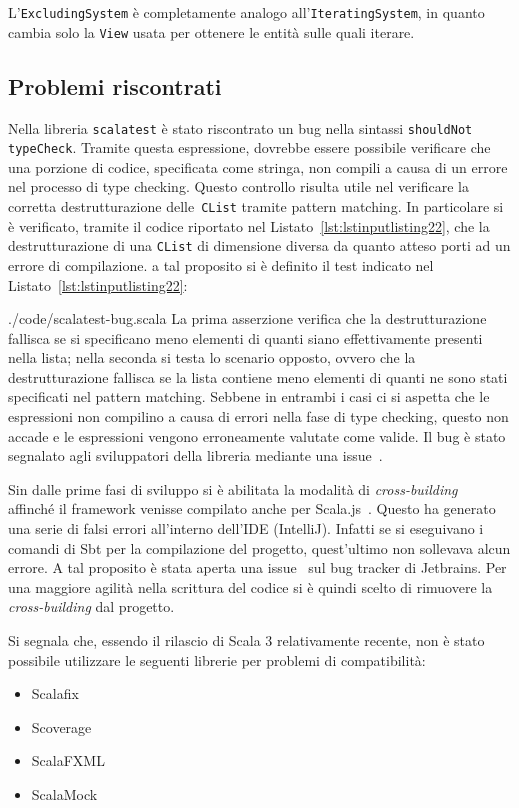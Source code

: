 L'\texttt{ExcludingSystem} è completamente analogo all'\texttt{IteratingSystem}, in quanto cambia solo la \texttt{View}
usata per ottenere le entità sulle quali iterare.

\subsection{Problemi riscontrati}\label{subsec:problemi-riscontrati}
Nella libreria \texttt{scalatest} è stato riscontrato un bug nella sintassi \texttt{shouldNot typeCheck}.
Tramite questa espressione, dovrebbe essere possibile verificare che una porzione di codice, specificata come stringa,
non compili a causa di un errore nel processo di type checking.
Questo controllo risulta utile nel verificare la corretta destrutturazione delle~\texttt{CList} tramite pattern
matching.
In particolare si è verificato, tramite il codice riportato nel Listato~\ref{lst:lstinputlisting22}, che la
destrutturazione di una \texttt{CList} di dimensione diversa da quanto atteso porti ad un errore di compilazione.
a tal proposito si è definito il test indicato nel Listato~\ref{lst:lstinputlisting22}:

{./code/scalatest-bug.scala}
La prima asserzione verifica che la destrutturazione fallisca se si specificano meno elementi di quanti siano
effettivamente presenti nella lista;
nella seconda si testa lo scenario opposto, ovvero che la destrutturazione fallisca se la lista contiene meno elementi
di quanti ne sono stati specificati nel pattern matching.
Sebbene in entrambi i casi ci si aspetta che le espressioni non compilino a causa di errori nella fase di type checking,
questo non accade e le espressioni vengono erroneamente valutate come valide.
Il bug è stato segnalato agli sviluppatori della libreria mediante una issue~\cite{scalatest-bug}.

Sin dalle prime fasi di sviluppo si è abilitata la modalità di \textit{cross-building}~\cite{cross-building} affinché il
framework venisse compilato anche per Scala.js~\cite{scalajs}.
Questo ha generato una serie di falsi errori all'interno dell'IDE (IntelliJ).
Infatti se si eseguivano i comandi di Sbt per la compilazione del progetto, quest'ultimo non sollevava alcun errore.
A tal proposito è stata aperta una issue~\cite{intellij-issue} sul bug tracker di Jetbrains.
Per una maggiore agilità nella scrittura del codice si è quindi scelto di rimuovere la \textit{cross-building} dal
progetto.

Si segnala che, essendo il rilascio di Scala 3 relativamente recente, non è stato possibile utilizzare
le seguenti librerie per problemi di compatibilità:
\begin{itemize}
    \item Scalafix
    \item Scoverage
    \item ScalaFXML
    \item ScalaMock
\end{itemize}
